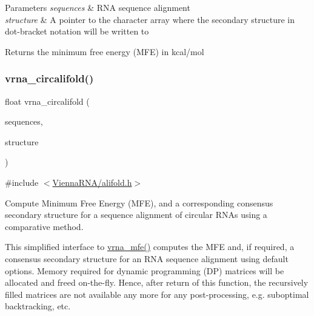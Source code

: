 \begin{DoxyParams}{Parameters}
{\em sequences} & R\+NA sequence alignment \\
\hline
{\em structure} & A pointer to the character array where the secondary structure in dot-\/bracket notation will be written to \\
\hline
\end{DoxyParams}
\begin{DoxyReturn}{Returns}
the minimum free energy (M\+FE) in kcal/mol 
\end{DoxyReturn}
\mbox{\label{group__consensus__mfe__fold_ga17a1be7490468c29c335ba9bffacba53}} 
\subsubsection{\texorpdfstring{vrna\+\_\+circalifold()}{vrna\_circalifold()}}
{\footnotesize\ttfamily float vrna\+\_\+circalifold (\begin{DoxyParamCaption}\item[{const char $\ast$$\ast$}]{sequences,  }\item[{char $\ast$}]{structure }\end{DoxyParamCaption})}



{\ttfamily \#include $<$\mbox{\hyperlink{alifold_8h}{Vienna\+R\+N\+A/alifold.\+h}}$>$}



Compute Minimum Free Energy (M\+FE), and a corresponding consensus secondary structure for a sequence alignment of circular R\+N\+As using a comparative method. 

This simplified interface to \mbox{\hyperlink{group__mfe__fold_gabd3b147371ccf25c577f88bbbaf159fd}{vrna\+\_\+mfe()}} computes the M\+FE and, if required, a consensus secondary structure for an R\+NA sequence alignment using default options. Memory required for dynamic programming (DP) matrices will be allocated and free\textquotesingle{}d on-\/the-\/fly. Hence, after return of this function, the recursively filled matrices are not available any more for any post-\/processing, e.\+g. suboptimal backtracking, etc.

